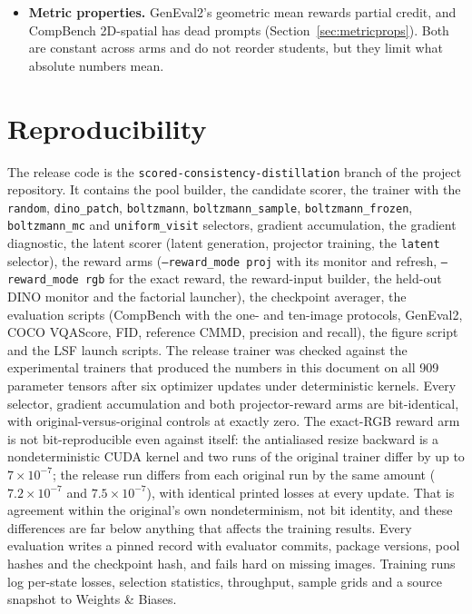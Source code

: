 \documentclass[11pt,a4paper]{article}
\begin{document}
\begin{itemize}
\item \textbf{Metric properties.} GenEval2's geometric mean rewards partial credit, and CompBench 2D-spatial has dead prompts (Section~\ref{sec:metricprops}). Both are constant across arms and do not reorder students, but they limit what absolute numbers mean.
\end{itemize}

\section{Reproducibility}
The release code is the \texttt{scored-consistency-distillation} branch of the project repository. It contains the pool builder, the candidate scorer, the trainer with the \texttt{random}, \texttt{dino\_patch}, \texttt{boltzmann}, \texttt{boltzmann\_sample}, \texttt{boltzmann\_frozen}, \texttt{boltzmann\_mc} and \texttt{uniform\_visit} selectors, gradient accumulation, the gradient diagnostic, the latent scorer (latent generation, projector training, the \texttt{latent} selector), the reward arms (\texttt{--reward\_mode proj} with its monitor and refresh, \texttt{--reward\_mode rgb} for the exact reward, the reward-input builder, the held-out DINO monitor and the factorial launcher), the checkpoint averager, the evaluation scripts (CompBench with the one- and ten-image protocols, GenEval2, COCO VQAScore, FID, reference CMMD, precision and recall), the figure script and the LSF launch scripts. The release trainer was checked against the experimental trainers that produced the numbers in this document on all 909 parameter tensors after six optimizer updates under deterministic kernels. Every selector, gradient accumulation and both projector-reward arms are bit-identical, with original-versus-original controls at exactly zero. The exact-RGB reward arm is not bit-reproducible even against itself: the antialiased resize backward is a nondeterministic CUDA kernel and two runs of the original trainer differ by up to $7\times10^{-7}$; the release run differs from each original run by the same amount ($7.2\times10^{-7}$ and $7.5\times10^{-7}$), with identical printed losses at every update. That is agreement within the original's own nondeterminism, not bit identity, and these differences are far below anything that affects the training results. Every evaluation writes a pinned record with evaluator commits, package versions, pool hashes and the checkpoint hash, and fails hard on missing images. Training runs log per-state losses, selection statistics, throughput, sample grids and a source snapshot to Weights \& Biases.
\end{document}
